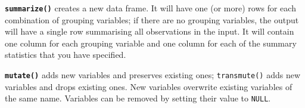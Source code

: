 \documentclass[
  letterpaper,
  DIV=11,
  numbers=noendperiod]{scrartcl}
\begin{document}
\textbf{\texttt{summarize()}} creates a new data frame. It will have one
(or more) rows for each combination of grouping variables; if there are
no grouping variables, the output will have a single row summarising all
observations in the input. It will contain one column for each grouping
variable and one column for each of the summary statistics that you have
specified.

\textbf{\texttt{mutate()}} adds new variables and preserves existing
ones; \texttt{transmute()} adds new variables and drops existing ones.
New variables overwrite existing variables of the same name. Variables
can be removed by setting their value to \texttt{NULL}.
\end{document}
